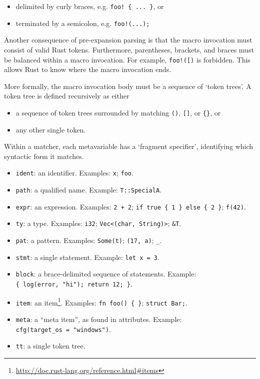 \documentclass[a4paper,]{book}
\renewcommand{\href}[2]{#2\footnote{\url{#1}}}
\begin{document}
\begin{itemize}
\itemsep1pt\parskip0pt
\item
  delimited by curly braces, e.g. \texttt{foo!\ \{\ ...\ \}}, or
\item
  terminated by a semicolon, e.g. \texttt{foo!(...);}
\end{itemize}

Another consequence of pre-expansion parsing is that the macro
invocation must consist of valid Rust tokens. Furthermore, parentheses,
brackets, and braces must be balanced within a macro invocation. For
example, \texttt{foo!({[})} is forbidden. This allows Rust to know where
the macro invocation ends.

More formally, the macro invocation body must be a sequence of `token
trees'. A token tree is defined recursively as either

\begin{itemize}
\itemsep1pt\parskip0pt
\item
  a sequence of token trees surrounded by matching \texttt{()},
  \texttt{{[}{]}}, or \texttt{\{\}}, or
\item
  any other single token.
\end{itemize}

Within a matcher, each metavariable has a `fragment specifier',
identifying which syntactic form it matches.

\begin{itemize}
\itemsep1pt\parskip0pt
\item
  \texttt{ident}: an identifier. Examples: \texttt{x}; \texttt{foo}.
\item
  \texttt{path}: a qualified name. Example: \texttt{T::SpecialA}.
\item
  \texttt{expr}: an expression. Examples: \texttt{2\ +\ 2};
  \texttt{if\ true\ \{\ 1\ \}\ else\ \{\ 2\ \}}; \texttt{f(42)}.
\item
  \texttt{ty}: a type. Examples: \texttt{i32};
  \texttt{Vec\textless{}(char,\ String)\textgreater{}}; \texttt{\&T}.
\item
  \texttt{pat}: a pattern. Examples: \texttt{Some(t)};
  \texttt{(17,\ \textquotesingle{}a\textquotesingle{})}; \texttt{\_}.
\item
  \texttt{stmt}: a single statement. Example: \texttt{let\ x\ =\ 3}.
\item
  \texttt{block}: a brace-delimited sequence of statements. Example:
  \texttt{\{\ log(error,\ "hi");\ return\ 12;\ \}}.
\item
  \texttt{item}: an
  \href{http://doc.rust-lang.org/reference.html\#items}{item}. Examples:
  \texttt{fn\ foo()\ \{\ \}}; \texttt{struct\ Bar;}.
\item
  \texttt{meta}: a ``meta item'', as found in attributes. Example:
  \texttt{cfg(target\_os\ =\ "windows")}.
\item
  \texttt{tt}: a single token tree.
\end{itemize}
\end{document}
